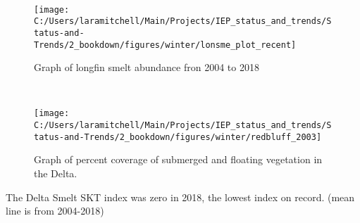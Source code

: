 \documentclass[
]{book}
\begin{document}
\begin{panel-grid}
\begin{columns-nocenter}
\begin{column800}
\begin{expand}
\end{expand}

\end{column800}

\begin{column40}

~

\end{column40}

\begin{column800}

\begin{expand}

\begin{figure}
\texttt{[image: C:/Users/laramitchell/Main/Projects/IEP\_status\_and\_trends/Status-and-Trends/2\_bookdown/figures/winter/lonsme\_plot\_recent]} \caption{Graph of longfin smelt abundance fron 2004 to 2018}\label{fig:unnamed-chunk-183}
\end{figure}

\end{expand}

\end{column800}

\begin{column40}

~

\end{column40}

\begin{column800}

\begin{expand}

\begin{figure}
\texttt{[image: C:/Users/laramitchell/Main/Projects/IEP\_status\_and\_trends/Status-and-Trends/2\_bookdown/figures/winter/redbluff\_2003]} \caption{Graph of percent coverage of submerged and floating vegetation in the Delta.}\label{fig:unnamed-chunk-184}
\end{figure}

\end{expand}

\end{column800}

\end{columns-nocenter}

\begin{columns-nocenter}

\begin{column800}

The Delta Smelt SKT index was zero in 2018, the lowest index on record. (mean line is from 2004-2018)


\end{column800}
\end{columns-nocenter}
\end{panel-grid}
\end{document}
